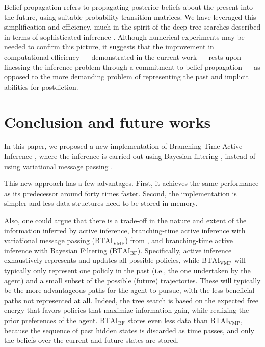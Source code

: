 \documentclass[twoside,11pt]{article}
\begin{document}
Belief propagation refers to propagating posterior beliefs about the present into the future, using suitable probability transition matrices. We have leveraged this simplification and efficiency, much in the spirit of the deep tree searches described in terms of sophisticated inference \citep{sophisticated}. Although numerical experiments may be needed to confirm this picture, it suggests that the improvement in computational efficiency --- demonstrated in the current work --- rests upon finessing the inference problem through a commitment to belief propagation --- as opposed to the more demanding problem of representing the past and implicit abilities for postdiction.

\section{Conclusion and future works} \label{sec:conclusion}

In this paper, we proposed a new implementation of Branching Time Active Inference \citep{AITS_THEORY,AITS_PRACTICE}, where the inference is carried out using Bayesian filtering \citep{BAYESIAN_FILTERING}, instead of using variational message passing \citep{AI_VMP,VMP_TUTO}.

This new approach has a few advantages. First, it achieves the same performance as its predecessor around forty times faster. Second, the implementation is simpler and less data structures need to be stored in memory.

Also, one could argue that there is a trade-off in the nature and extent of the information inferred by active inference, branching-time active inference with variational message passing ($\text{BTAI}_{\text{VMP}}$) from \citet{AITS_THEORY,AITS_PRACTICE}, and branching-time active inference with Bayesian Filtering ($\text{BTAI}_{\text{BF}}$). Specifically, active inference exhaustively represents and updates all possible policies, while $\text{BTAI}_{\text{VMP}}$ will typically only represent one policly in the past (i.e., the one undertaken by the agent) and a small subset of the possible (future) trajectories. These will typically be the more advantageous paths for the agent to pursue, with the less beneficial paths not represented at all. Indeed, the tree search is based on the expected free energy that favors policies that maximize information gain, while realizing the prior preferences of the agent. $\text{BTAI}_{\text{BF}}$ stores even less data than $\text{BTAI}_{\text{VMP}}$, because the sequence of past hidden states is discarded as time passes, and only the beliefs over the current and future states are stored.
\end{document}
